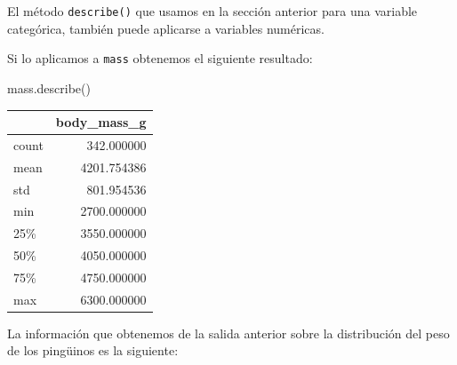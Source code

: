 \documentclass[
  a4paper,
  noprof,
  12pt,
  notoc,
  nosols,
  nobib]{mnye}
\newenvironment{Shaded}{\begin{snugshade}}{\end{snugshade}}
\newcommand{\NormalTok}[1]{\textcolor[rgb]{0.00,0.23,0.31}{#1}}
\theoremstyle{definition}
\theoremstyle{remark}
\begin{document}
El método \texttt{describe()} que usamos en la sección anterior para una
variable categórica, también puede aplicarse a variables numéricas.

Si lo aplicamos a \texttt{mass} obtenemos el siguiente resultado:

\begin{Shaded}
\begin{Highlighting}[]
\NormalTok{mass.describe()}
\end{Highlighting}
\end{Shaded}

\begin{tabular}{lr}
\toprule
{} &  body\_mass\_g \\
\midrule
count &   342.000000 \\
mean  &  4201.754386 \\
std   &   801.954536 \\
min   &  2700.000000 \\
25\%   &  3550.000000 \\
50\%   &  4050.000000 \\
75\%   &  4750.000000 \\
max   &  6300.000000 \\
\bottomrule
\end{tabular}

La información que obtenemos de la salida anterior sobre la distribución
del peso de los pingüinos es la siguiente:
\end{document}
